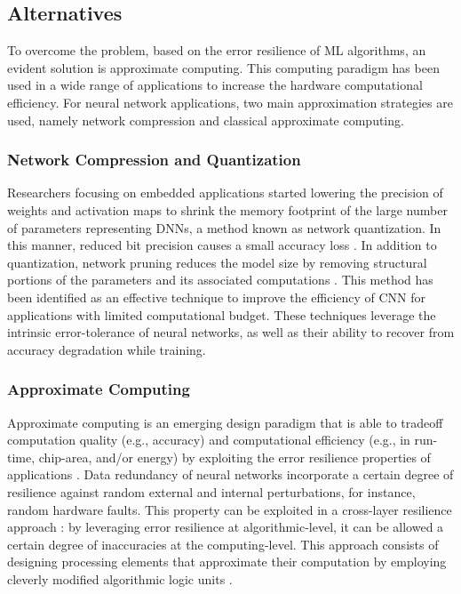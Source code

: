 \subsection{Alternatives}
To overcome the problem, based on the error resilience of ML algorithms, an evident solution is approximate computing. This computing paradigm has been used in a wide range of applications to increase the hardware computational efficiency\cite{han2013approximate}. For neural network applications, two main approximation strategies are used, namely network compression and classical approximate computing\cite{bouvier2019spiking}.

\subsubsection{Network Compression and Quantization}
Researchers focusing on embedded applications started lowering the precision of weights and activation maps to shrink the memory footprint of the large number of parameters representing DNNs, a method known as network quantization. In this manner, reduced bit precision causes a small accuracy loss \cite{courbariaux2015binaryconnect, han2015deep, hubara2017quantized, rastegari2016xnor}. In addition to quantization, network pruning reduces the model size by removing structural portions of the parameters and its associated computations \cite{lecun1989optimal,hassibi1992second}. This method has been identified as an effective technique to improve the efficiency of CNN for applications with limited computational budget\cite{molchanov2016pruning,li2016pruning, liu2018rethinking}. These techniques leverage the intrinsic error-tolerance of neural networks, as well as their ability to recover from accuracy degradation while training.

\subsubsection{Approximate Computing}
Approximate computing is an emerging design paradigm that is able to tradeoff computation quality (e.g., accuracy) and computational efficiency (e.g., in run-time, chip-area, and/or energy) by exploiting the error resilience properties of applications \cite{gillani2020exploiting, zhang2015approxann}. Data redundancy of neural networks incorporate a certain degree of resilience against random external and internal perturbations, for instance, random hardware faults. This property can be exploited in a cross-layer resilience approach \cite{carter2010design}: by leveraging error resilience at algorithmic-level, it can be allowed a certain degree of inaccuracies at the computing-level. This approach consists of designing processing elements that approximate their computation by employing cleverly modified algorithmic logic units \cite{han2013approximate}. 

